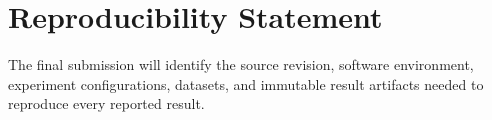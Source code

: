 \section*{Reproducibility Statement}

The final submission will identify the source revision, software environment,
experiment configurations, datasets, and immutable result artifacts needed to
reproduce every reported result.
